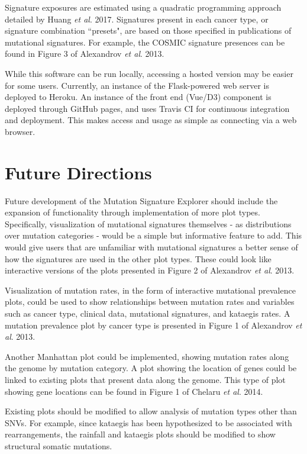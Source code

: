 \documentclass[12pt, letterpaper]{article}
\begin{document}
Signature exposures are estimated using a quadratic programming approach detailed by Huang \textit{et al}. 2017\cite{huang2017detecting}.
Signatures present in each cancer type, or signature combination ``presets", are based on those specified in publications of mutational signatures.
For example, the COSMIC signature presences can be found in Figure 3 of Alexandrov \textit{et al}. 2013\cite{alexandrov2013signatures}.

While this software can be run locally, accessing a hosted version may be easier for some users.
Currently, an instance of the Flask-powered web server is deployed to Heroku.
An instance of the front end (Vue/D3) component is deployed through GitHub pages, and uses Travis CI for continuous integration and deployment.
This makes access and usage as simple as connecting via a web browser.

\section{Future Directions}
Future development of the Mutation Signature Explorer should include the expansion of functionality through implementation of more plot types.
Specifically, visualization of mutational signatures themselves - as distributions over mutation categories - would be a simple but informative feature to add.
This would give users that are unfamiliar with mutational signatures a better sense of how the signatures are used in the other plot types.
These could look like interactive versions of the plots presented in Figure 2 of Alexandrov \textit{et al}. 2013\cite{alexandrov2013signatures}.

Visualization of mutation rates, in the form of interactive mutational prevalence plots, could be used to show relationships between mutation rates and variables such as cancer type, clinical data, mutational signatures, and kataegis rates.
A mutation prevalence plot by cancer type is presented in Figure 1 of Alexandrov \textit{et al}. 2013\cite{alexandrov2013signatures}.

Another Manhattan plot could be implemented, showing mutation rates along the genome by mutation category.
A plot showing the location of genes could be linked to existing plots that present data along the genome.
This type of plot showing gene locations can be found in Figure 1 of Chelaru \textit{et al}. 2014\cite{chelaru2014epiviz}.

Existing plots should be modified to allow analysis of mutation types other than SNVs. 
For example, since kataegis has been hypothesized to be associated with rearrangements, the rainfall and kataegis plots should be modified to show structural somatic mutations.
\end{document}

